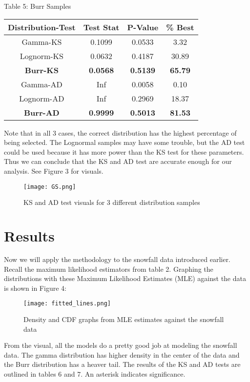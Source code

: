 \documentclass[letterpaper,12pt]{article}
\begin{document}
\begin{table}[H]
Table 5: Burr Samples \\
\begin{tabular}{|c|c|c|c|}\hline
Distribution-Test & Test Stat       & P-Value         & \% Best        \\\hline
Gamma-KS          & 0.1099          & 0.0533          & 3.32           \\
Lognorm-KS        & 0.0632          & 0.4187          & 30.89          \\
\textbf{Burr-KS}  & \textbf{0.0568} & \textbf{0.5139} & \textbf{65.79} \\\hline
Gamma-AD          & Inf             & 0.0058          & 0.10           \\
Lognorm-AD        & Inf             & 0.2969          & 18.37          \\
\textbf{Burr-AD}  & \textbf{0.9999} & \textbf{0.5013} & \textbf{81.53} \\\hline
\end{tabular}
\end{table}

Note that in all 3 cases, the correct distribution has the highest percentage of being selected. The Lognormal samples may have some trouble, but the AD test could be used because it has more power than the KS test for these parameters. Thus we can conclude that the KS and AD test are accurate enough for our analysis. See Figure 3 for visuals. 

\begin{figure}[H]
    \centering
    \caption{KS and AD test visuals for 3 different distribution samples}
    \texttt{[image: GS.png]}
\end{figure}



\section{Results}
Now we will apply the methodology to the snowfall data introduced earlier. Recall the maximum likelihood estimators from table 2. Graphing the distributions with these Maximum Likelihood Estimates (MLE) against the data is shown in Figure 4:
\begin{figure}[H]
    \centering
    \caption{Density and CDF graphs from MLE estimates against the snowfall data}
    \texttt{[image: fitted\_lines.png]}
\end{figure}

From the visual, all the models do a pretty good job at modeling the snowfall data. The gamma distribution has higher density in the center of the data and the Burr distribution has a heaver tail. The results of the KS and AD tests are outlined in tables 6 and 7. An asterisk indicates significance.
\end{document}

